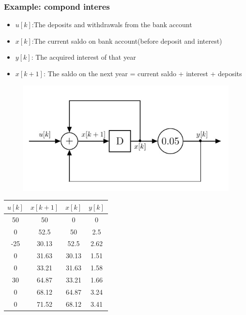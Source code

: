 \begin{frame}
	\frametitle{Example: compond interes}
	\begin{itemize}
			\item $ u[k]$:The deposits and withdrawals from the bank account
			\item $ x[k]$:The current saldo on bank account(before deposit and interest)
			\item $ y[k]$: The acquired interest of that year
			\item $ x[k+1]$: The saldo on the next year = current saldo + interest + deposits
	\end{itemize}

	\begin{figure}
		\centering
		\includegraphics[height=0.4\textheight]{Images/discrete_time_systems_3}
	\end{figure}
\end{frame}
\begin{frame}
	\begin{tabular}{|c|c|c|c|}
		\hline  $u[k]$& $x[k+1]$  & $x[k]$  & $y[k]$  \\ 
		\hline  50 & 50 & 0  & 0  \\ 
		\hline  0 & 52.5  & 50 & 2.5  \\ 
		\hline  -25 & 30.13 & 52.5 & 2.62  \\ 
		\hline  0 &  31.63 & 30.13  & 1.51  \\ 
		\hline  0 & 33.21  & 31.63 & 1.58 \\ 
		\hline  30 & 64.87 & 33.21  & 1.66 \\ 
		\hline  0 & 68.12 & 64.87 & 3.24  \\ 
		\hline  0 & 71.52 & 68.12 & 3.41 \\
		\hline 
	\end{tabular}
	

\end{frame}
